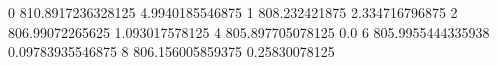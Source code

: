 0 810.8917236328125 4.9940185546875
1 808.232421875 2.334716796875
2 806.99072265625 1.093017578125
4 805.897705078125 0.0
6 805.9955444335938 0.09783935546875
8 806.156005859375 0.25830078125
